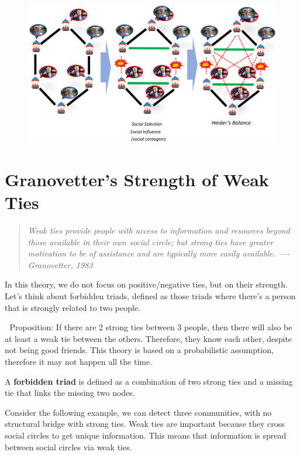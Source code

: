 \documentclass[
  notitlepage,
  onecolumn,
  openany]{book}
\begin{document}
\begin{figure}[h!]

{\centering \includegraphics[width=0.6\linewidth]{images/07-Triads and structural holes/Untitled} 

}

\end{figure}

\hypertarget{granovetters-strength-of-weak-ties}{%
\section{Granovetter's Strength of Weak Ties}\label{granovetters-strength-of-weak-ties}}

\begin{quote}
\emph{Weak ties provide people with access to information and resources
beyond those available in their own social circle; but strong ties
have greater motivation to be of assistance and are typically more
easily available. ---- Granovetter, 1983}
\end{quote}

In this theory, we do not focus on positive/negative ties, but on their
strength. Let's think about forbidden triads, defined as those triads
where there's a person that is strongly related to two people.

💁️ Proposition: If there are 2 strong ties between 3 people, then there
will also be at least a weak tie between the others. Therefore, they
know each other, despite not being good friends. This theory is based on
a probabilistic assumption, therefore it may not happen all the time.

A \textbf{forbidden triad} is defined as a combination of two strong ties and
a missing tie that links the missing two nodes.

Consider the following example, we can detect three communities, with no
structural bridge with strong ties. Weak ties are important because they
cross social circles to get unique information. This means that
information is spread between social circles via weak ties.
\end{document}
